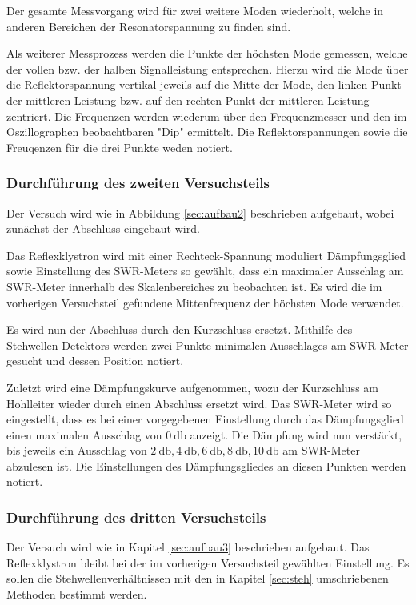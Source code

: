 Der gesamte Messvorgang wird für zwei weitere Moden wiederholt, welche in anderen Bereichen der Resonatorspannung zu finden sind.

Als weiterer Messprozess werden die Punkte der höchsten Mode gemessen, welche der vollen bzw. der halben Signalleistung entsprechen.
Hierzu wird die Mode über die Reflektorspannung vertikal jeweils auf die Mitte der Mode, den linken Punkt der mittleren Leistung bzw. auf den rechten Punkt der mittleren Leistung zentriert.
Die Frequenzen werden wiederum über den Frequenzmesser und den im Oszillographen beobachtbaren "Dip" ermittelt.
Die Reflektorspannungen sowie die Freuqenzen für die drei Punkte weden notiert.

\subsubsection{Durchführung des zweiten Versuchsteils}

Der Versuch wird wie in Abbildung \ref{sec:aufbau2} beschrieben aufgebaut, wobei zunächst der Abschluss eingebaut wird.

Das Reflexklystron wird mit einer Rechteck-Spannung moduliert Dämpfungsglied sowie Einstellung des SWR-Meters so gewählt, dass ein maximaler Ausschlag am SWR-Meter innerhalb des Skalenbereiches zu beobachten ist.
Es wird die im vorherigen Versuchsteil gefundene Mittenfrequenz der höchsten Mode verwendet.

Es wird nun der Abschluss durch den Kurzschluss ersetzt.
Mithilfe des Stehwellen-Detektors werden zwei Punkte minimalen Ausschlages am SWR-Meter gesucht und dessen Position notiert.

Zuletzt wird eine Dämpfungskurve aufgenommen, wozu der Kurzschluss am Hohlleiter wieder durch einen Abschluss ersetzt wird.
Das SWR-Meter wird so eingestellt, dass es bei einer vorgegebenen Einstellung durch das Dämpfungsglied einen maximalen Ausschlag von $\SI{0}{\decibel}$ anzeigt.
Die Dämpfung wird nun verstärkt, bis jeweils ein Ausschlag von $\SI{2}{\decibel}, \SI{4}{\decibel}, \SI{6}{\decibel}, \SI{8}{\decibel}, \SI{10}{\decibel}$ am SWR-Meter abzulesen ist.
Die Einstellungen des Dämpfungsgliedes an diesen Punkten werden notiert.

\subsubsection{Durchführung des dritten Versuchsteils}

Der Versuch wird wie in Kapitel \ref{sec:aufbau3} beschrieben aufgebaut.
Das Reflexklystron bleibt bei der im vorherigen Versuchsteil gewählten Einstellung.
Es sollen die Stehwellenverhältnissen mit den in Kapitel \ref{sec:steh} umschriebenen Methoden bestimmt werden.

